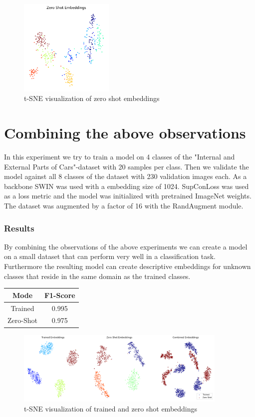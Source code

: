 \documentclass[12pt,a4paper]{report}
\newcommand{\splitlayout}[2]{
	\begin{minipage}{0.6\textwidth}
		#1
	\end{minipage}
	\hfill
	\begin{minipage}{0.35\textwidth}
		#2
	\end{minipage}	
}
\begin{document}
\begin{figure}[hb]
	\centering
	\includegraphics[width=0.4\textwidth]{../plots/zero_shot_embeddings.png}
	\caption{t-SNE visualization of zero shot embeddings}
\end{figure}

\newpage

\section{Combining the above observations}

In this experiment we try to train a model on 4 classes of the "Internal and External Parts of Cars"-dataset with 20 samples per class.
Then we validate the model against all 8 classes of the dataset with 230 validation images each.
As a backbone SWIN was used with a embedding size of 1024.
SupConLoss was used as a loss metric and the model was initialized with pretrained ImageNet weights.
The dataset was augmented by a factor of 16 with the RandAugment module.

\subsubsection{Results}
\splitlayout{
	By combining the observations of the above experiments we can create a model on a small dataset that can perform very well in a classification task.
	Furthermore the resulting model can create descriptive embeddings for unknown classes that reside in the same domain as the trained classes.
}{
	\begin{tabular}{ | c | c | }
		\hline
		Mode & F1-Score \\ 
		\hline
		Trained & 0.995  \\ 
		\hline
		Zero-Shot & 0.975  \\ 
		\hline
	\end{tabular}
}

\begin{figure}[hb]
	\centering
	\includegraphics[width=0.9\textwidth]{../plots/final.png}
	\caption{t-SNE visualization of trained and zero shot embeddings}
\end{figure}
\end{document}
